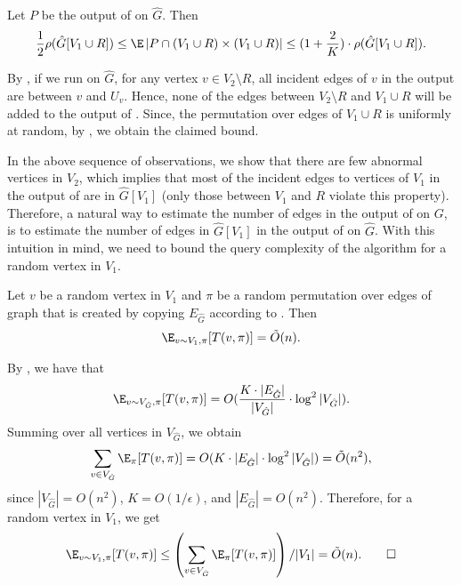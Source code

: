 \begin{observation}\label{obs: small-TSP-R}
Let $P$ be the output of \algtwo{} on $\hat{G}$. Then
$$
    \frac{1}{2} \rho(\hat{G}[V_1 \cup R]) \leq \E \left|P \cap (V_1 \cup R) \times (V_1 \cup R) \right| \leq (1+\frac{2}{K})\cdot \rho(\hat{G}[V_1 \cup R])
.$$
\end{observation}
\begin{myproof}
By , if we run \algtwo{} on $\hat{G}$, for any vertex $v \in V_2 \setminus R$, all incident edges of $v$ in the output are between $v$ and $U_v$. Hence, none of the edges between $V_2 \setminus R$ and $V_1 \cup R$ will be added to the output of \algtwo{}. Since, the permutation over edges of $V_1 \cup R$ is uniformly at random, by , we obtain the claimed bound.
\end{myproof}


In the above sequence of observations, we show that there are few abnormal vertices in $V_2$, which implies that most of the incident edges to vertices of $V_1$ in the output of \algtwo{} are in $\hat{G}[V_1]$ (only those between $V_1$ and $R$ violate this property). Therefore, a natural way to estimate the number of edges in the output of \algtwo{} on $G$, is to estimate the number of edges in $\hat{G}[V_1]$ in the output of \algtwo{} on $\hat{G}$. With this intuition in mind, we need to bound the query complexity of the algorithm for a random vertex in $V_1$.


\begin{claim}\label{clm: v1query}
Let $v$ be a random vertex in $V_1$ and $\pi$ be a random permutation over edges of graph that is created by copying $E_{\hat{G}}$ according to \algtwo{}. Then
\begin{align*}
    \E_{v\sim V_1, \pi}[T(v, \pi)] = \tilde{O}(n).
\end{align*}
\end{claim}
\begin{myproof}
By , we have that
\begin{align*}
\E_{v\sim V_{\hat{G}}, \pi}[T(v, \pi)] = O(\frac{K\cdot |E_{\hat{G}}|}{|V_{\hat{G}}|}\cdot \log^2 |V_{\hat{G}}|).
\end{align*}
Summing over all vertices in $V_{\hat{G}}$, we obtain
\begin{align*}
    \sum_{v \in V_{\hat{G}}}\E_{\pi}[T(v, \pi)] = O(K \cdot |E_{\hat{G}}| \cdot \log^2 |V_{\hat{G}}|) = \tilde{O}(n^2),
\end{align*}
since $|V_{\hat{G}}| = O(n^2)$, $K = O(1/\epsilon)$, and $|E_{\hat{G}}| = O(n^2)$. Therefore, for a random vertex in $V_1$, we get
\begin{align*}
    \E_{v\sim V_1,\pi}[T(v, \pi)] \leq \left( \sum_{v \in V_{\hat{G}}}\E_{\pi}[T(v, \pi)] \right) / |V_1| = \tilde{O}(n). \qedhere
\end{align*}
\end{myproof}

